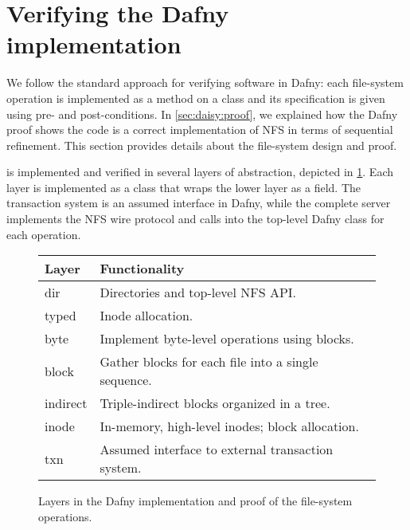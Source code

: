 \section{Verifying the Dafny implementation}%
\label{sec:daisy:design}

We follow the standard approach for verifying software in Dafny: each
file-system operation is implemented as a method on a class and its
specification is given using pre- and post-conditions. In \cref{sec:daisy:proof},
we explained how the Dafny proof shows the code is a correct implementation of NFS in terms of sequential refinement. This
section provides details about the file-system design and proof.


\sys is implemented and verified in several layers of abstraction, depicted in
\cref{fig:dafny-layers}. Each layer is implemented as a class that wraps the
lower layer as a field. The transaction system is an assumed interface in Dafny,
while the complete server implements the NFS wire protocol and calls into the
top-level Dafny class for each operation.


\begin{figure}
\small \centering
\begin{tabular}{ll}
  \toprule
  \textbf{Layer} & \textbf{Functionality} \\
  \midrule
  dir & Directories and top-level NFS API. \\
  typed & Inode allocation. \\
  byte & Implement byte-level operations using blocks. \\
  block & Gather blocks for each file into a single sequence. \\
  indirect & Triple-indirect blocks organized in a tree. \\
  inode & In-memory, high-level inodes; block allocation. \\
  txn & Assumed interface to external transaction system. \\
  \bottomrule
\end{tabular}
\caption{Layers in the Dafny implementation and proof of the file-system
operations.}
\label{fig:dafny-layers}
\end{figure}

